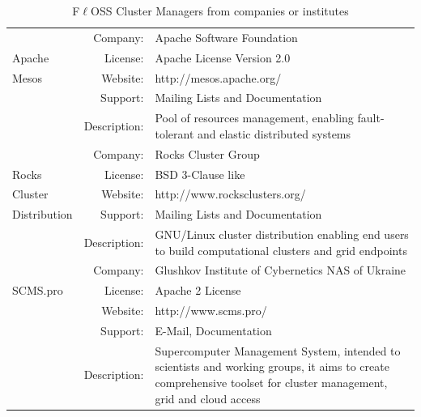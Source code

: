 \documentclass[a4paper, 12pt]{book}
\begin{document}
\begin{table}[H]
  \centering
  \begin{tabular}{ | m{2cm} | r  m{10cm} | }

    \hline    
		& Company: &  Apache Software Foundation\\
      Apache 	& License: & Apache License Version 2.0 \\
      Mesos	& Website: & http://mesos.apache.org/ \\
	 	& Support: & Mailing Lists and Documentation\\
	 	& Description: & Pool of resources management, enabling fault-tolerant and elastic distributed systems \\
	 	
    \hline        
		 & Company: & Rocks Cluster Group \\
     Rocks 	 & License: & BSD 3-Clause like \\
     Cluster	 & Website: & http://www.rocksclusters.org/ \\
   Distribution	 & Support: &  Mailing Lists and Documentation\\
	 	 & Description: & GNU/Linux cluster distribution enabling end users to build computational clusters and grid endpoints \\
    \hline    
		 & Company: & Glushkov Institute of Cybernetics NAS of Ukraine \\
      SCMS.pro   & License: & Apache 2 License \\
		 & Website: & http://www.scms.pro/ \\
	 	 & Support: & E-Mail, Documentation \\
	 	 & Description: & Supercomputer Management System, intended to scientists and working groups, it aims to create comprehensive toolset for cluster management, grid and cloud access \\
    \hline
  \end{tabular}
\caption{F$\ell$OSS Cluster Managers from companies or institutes}
\label{table:cluster_managers_companies}
\end{table}
\end{document}
